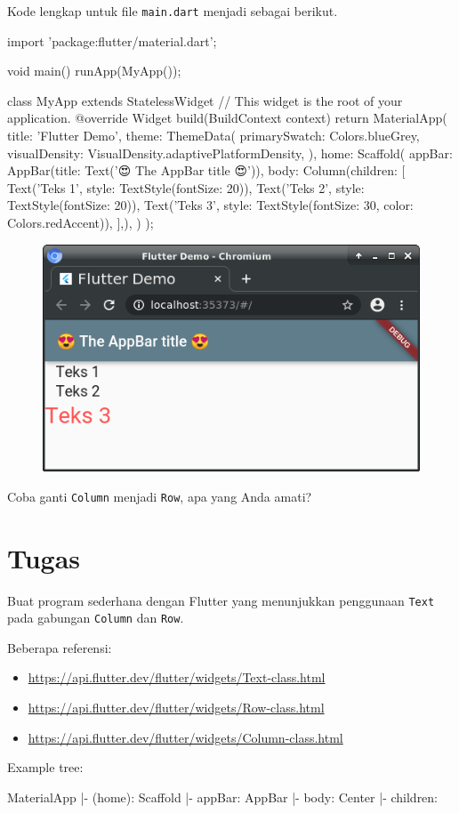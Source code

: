 \documentclass[a4paper,11pt]{article} %
\newcommand{\txtinline}[1]{\texttt{#1}}
\begin{document}
Kode lengkap untuk file \txtinline{main.dart} menjadi sebagai berikut.
\begin{dartcode}
import 'package:flutter/material.dart';

void main() {
  runApp(MyApp());
}
  
class MyApp extends StatelessWidget {
  // This widget is the root of your application.
  @override
  Widget build(BuildContext context) {
    return MaterialApp(
      title: 'Flutter Demo',
      theme: ThemeData(
        primarySwatch: Colors.blueGrey,
        visualDensity: VisualDensity.adaptivePlatformDensity,
      ),
      home: Scaffold(
        appBar: AppBar(title: Text('😍 The AppBar title 😍')),
        body: Column(children: [
          Text('Teks 1', style: TextStyle(fontSize: 20)),
          Text('Teks 2', style: TextStyle(fontSize: 20)),
          Text('Teks 3', style: TextStyle(fontSize: 30, color: Colors.redAccent)),
        ],),
      )
    );
  }
}
\end{dartcode}

\begin{figure}[H]
{\centering
\includegraphics[scale=0.75]{images/flutter_column_01.png}
\par}
\end{figure}

Coba ganti \txtinline{Column} menjadi \txtinline{Row}, apa yang Anda amati?

\section{Tugas}
Buat program sederhana dengan Flutter yang menunjukkan penggunaan
\txtinline{Text} pada gabungan \txtinline{Column} dan \txtinline{Row}.

Beberapa referensi:
\begin{itemize}
\item {\footnotesize\url{https://api.flutter.dev/flutter/widgets/Text-class.html}}
\item {\footnotesize\url{https://api.flutter.dev/flutter/widgets/Row-class.html}}
\item {\footnotesize\url{https://api.flutter.dev/flutter/widgets/Column-class.html}}
\end{itemize}

Example tree:
\begin{textcode}
MaterialApp
|- (home): Scaffold
   |- appBar: AppBar
   |- body: Center
      |- children:
\end{textcode}




\end{document}
